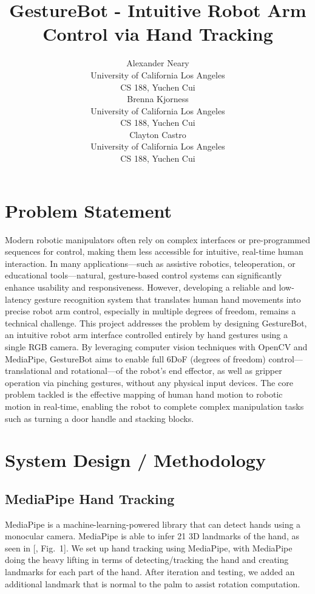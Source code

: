 \documentclass{article}
\title{GestureBot - Intuitive Robot Arm Control via Hand Tracking}
\author{
  Alexander Neary\\
  University of California Los Angeles \\
  CS 188, Yuchen Cui\\
  \And
  Brenna Kjorness\\
   University of California Los Angeles \\
  CS 188, Yuchen Cui\\
  \And
    Clayton Castro\\
     University of California Los Angeles \\
  CS 188, Yuchen Cui\\
}
\begin{document}
\maketitle{}




\section{Problem Statement}

Modern robotic manipulators often rely on complex interfaces or pre-programmed
sequences for control, making them less accessible for intuitive, real-time
human interaction. In many applications—such as assistive robotics,
teleoperation, or educational tools—natural, gesture-based control systems can
significantly enhance usability and responsiveness. However, developing a
reliable and low-latency gesture recognition system that translates human hand
movements into precise robot arm control, especially in multiple degrees of
freedom, remains a technical challenge. This project addresses the problem by
designing GestureBot, an intuitive robot arm interface controlled entirely
by hand gestures using a single RGB camera. By leveraging computer vision
techniques with OpenCV and MediaPipe, GestureBot aims to enable full 6DoF
(degrees of freedom) control—translational and rotational—of the robot’s end
effector, as well as gripper operation via pinching gestures, without any
physical input devices. The core problem tackled is the effective mapping of
human hand motion to robotic motion in real-time, enabling the robot to
complete complex manipulation tasks such as turning a door handle and stacking
blocks.


\section{System Design / Methodology}
\label{sec:citations}



\subsection{MediaPipe Hand Tracking}
MediaPipe is a machine-learning-powered library that can detect hands using a
monocular camera. MediaPipe is able to infer 21 3D landmarks of the hand, as
seen in [\citealp{MediaPipeHands}, Fig.~1]. We set up hand tracking using
MediaPipe\cite{MediaPipeGuide}, with MediaPipe doing the heavy lifting in terms
of detecting/tracking the hand and creating landmarks for each part of the
hand. After iteration and testing, we added an additional landmark that is
normal to the palm to assist rotation computation. 
\end{document}

